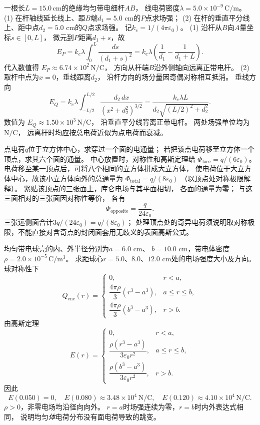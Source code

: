 \problemtext 一根长$L=15.0\,\mathrm{cm}$的绝缘均匀带电细杆$AB$，
线电荷密度$\lambda=5.0\times10^{-9}\,\mathrm{C/m}$。
(1) 在杆轴线延长线上、距$B$端$d_1=5.0$ cm的$P$点求场强；
(2) 在杆的垂直平分线上、距中点$d_2=5.0$ cm的$Q$点求场强。
\workings
记$k_e=1/(4\pi\varepsilon_0)$。
(1) 沿杆从$B$向$A$量坐标$s\in[0,L]$，
微元到$P$距离$d_1+s$，故
\[
\boxed{E_P=k_e\lambda\int_0^L\frac{ds}{(d_1+s)^2}
=k_e\lambda\left(\frac1{d_1}-\frac1{d_1+L}\right)}.
\]
代入数值得
$\boxed{E_P\approx6.74\times10^2\,\mathrm{N/C}}$，
方向从杆端$B$沿外侧轴向远离正带电杆。
(2) 取杆中点为$x=0$，垂线距离$d_2$，
沿杆方向的场分量因奇偶对称相互抵消。
垂线方向
\[
E_Q=k_e\lambda\int_{-L/2}^{L/2}
\frac{d_2\,dx}{(x^2+d_2^2)^{3/2}}
=\boxed{\frac{k_e\lambda L}{d_2\sqrt{(L/2)^2+d_2^2}}}.
\]
数值为
$\boxed{E_Q\approx1.50\times10^3\,\mathrm{N/C}}$，
沿垂直平分线背离正带电杆。
\crosscheck 两处场强单位均为$\mathrm{N/C}$，
远离杆时均应按总电荷近似为点电荷而衰减。

\problemtext 点电荷$q$位于立方体中心，求穿过一个面的电通量；
若把该点电荷移至立方体一个顶点，求其六个面的通量。
\workings
中心放置时，对称性和高斯定理给
$\boxed{\Phi_{\mathrm{face}}=q/(6\varepsilon_0)}$。
电荷移至某一顶点后，可将八个相同的立方体拼成大立方体，
使电荷位于大立方体中心，故该小立方体向外的总通量为
$\boxed{\Phi_{\mathrm{total}}=q/(8\varepsilon_0)}$
（以顶点处对称极限解释）。
紧贴该顶点的三张面上，库仑电场与其平面相切，
各面的通量为零；
与这三面相对的三张面因对称性等价，
各有
\[
\boxed{\Phi_{\mathrm{opposite}}=\frac{q}{24\varepsilon_0}}.
\]
\crosscheck 三张远侧面合计$3q/(24\varepsilon_0)=q/(8\varepsilon_0)$；
处理顶点处的奇异电荷须说明取对称极限，不能直接对含奇点的封闭面套用无歧义的表面高斯公式。

\problemtext 均匀带电球壳的内、外半径分别为$a=6.0$ cm、
$b=10.0$ cm，带电体密度
$\rho=2.0\times10^{-5}\,\mathrm{C/m^3}$。
求距球心$r=5.0$、$8.0$、$12.0$ cm处的电场强度大小及方向。
\workings
球对称性下
\[
Q_{\mathrm{enc}}(r)=
\begin{cases}
0,&r<a,\\
\dfrac{4\pi\rho}{3}(r^3-a^3),&a\le r\le b,\\
\dfrac{4\pi\rho}{3}(b^3-a^3),&r>b.
\end{cases}
\]
由高斯定理
\[
E(r)=
\begin{cases}
0,&r<a,\\
\dfrac{\rho(r^3-a^3)}{3\varepsilon_0r^2},&a\le r\le b,\\
\dfrac{\rho(b^3-a^3)}{3\varepsilon_0r^2},&r>b.
\end{cases}
\]
因此
\[
\boxed{E(0.050)=0},\quad
\boxed{E(0.080)\approx3.48\times10^4\,\mathrm{N/C}},
\quad
\boxed{E(0.120)\approx4.10\times10^4\,\mathrm{N/C}}.
\]
$\rho>0$，非零电场均沿径向向外。
\crosscheck $r=a$时场强连续为零，$r=b$时内外表达式相同，
说明均匀\emph{体}电荷分布没有面电荷导致的跳变。

